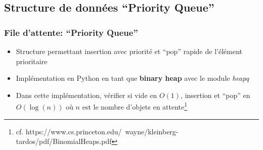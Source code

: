 \documentclass{beamer}
\begin{document}
\subsection{Structure de données ``Priority Queue''}
\begin{frame}
  \frametitle{File d'attente: ``Priority Queue''}
  \begin{itemize}
  \item Structure permettant insertion avec priorité et ``pop'' rapide de
    l'élément prioritaire
  \item Implémentation en Python en tant que \textbf{binary heap} avec le module \textit{heapq}
  \item Dans cette implémentation, vérifier si vide en $O(1)$, insertion et
    ``pop'' en $O\left(\log(n)\right)$ où $n$ est le nombre d'objets en attente\footnote{cf. https://www.cs.princeton.edu/~wayne/kleinberg-tardos/pdf/BinomialHeaps.pdf}
  \end{itemize}
\end{frame}
\end{document}
